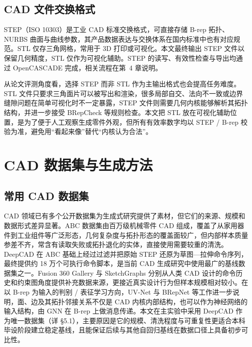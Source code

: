 \subsection{CAD 文件交换格式}

STEP（ISO 10303）是工业 CAD 标准交换格式，可直接存储 B-rep 拓扑、NURBS 曲面与曲线参数，其产品数据表达与交换体系在国内标准中也有对应规范\cite{gbt16656_1_2008,gbt16656_11_2010,gbt16656_21_2008}。STL 仅存三角网格，常用于 3D 打印或可视化。本文最终输出 STEP 文件以保留几何精度，STL 仅作为可视化辅助。STEP 的读写、有效性检查与导出均通过 OpenCASCADE 完成，相关流程在第~4 章说明。

从论文评测角度看，选择 STEP 而非 STL 作为主输出格式也会提高任务难度。STL 文件只要求三角面片可以被写出和渲染，很多局部自交、法向不一致或边界缝隙问题在简单可视化时不一定暴露，STEP 文件则需要几何内核能够解析其拓扑结构，并进一步接受 BRepCheck 等规则检查。本文把 STL 放在可视化辅助位置，是为了便于人工观察生成零件外观，但所有有效率数字均以 STEP / B-rep 校验为准，避免用“看起来像”替代“内核认为合法”。

\section{CAD 数据集与生成方法}

\subsection{常用 CAD 数据集}

CAD 领域已有多个公开数据集为生成式研究提供了素材，但它们的来源、规模和数据形式差异显著。ABC 数据集由百万级机械零件 CAD 组成，覆盖了从家用器件到工业组件等广泛形态，几何复杂度与拓扑形态的覆盖面较广\cite{koch_2019_abc}，但内部样本质量参差不齐，常含有读取失败或拓扑退化的实体，直接使用需要较重的清洗。DeepCAD\cite{wu_2021_deepcad} 在 ABC 基础上经过过滤并把原始 STEP 还原为草图—拉伸命令序列，最终提供约 18 万个可执行命令脚本，是当前 CAD 生成研究中使用最广的基线数据集之一。Fusion 360 Gallery 与 SketchGraphs 分别从人类 CAD 设计的命令历史和约束图角度提供补充数据来源\cite{willis_2021_fusion360,seff_2020_sketchgraphs}，更接近真实设计行为但样本规模相对较小。在以 B-rep 为输入的判别 / 表征学习方向，UV-Net\cite{Jayaraman_2021_CVPR} 与 BRepNet\cite{lambourne_2021_brepnet} 等工作进一步说明，面、边及其拓扑邻接关系不仅是 CAD 内核内部结构，也可以作为神经网络的输入结构，由 GNN 在 B-rep 上做消息传递。本文在主实验中采用 DeepCAD 作为唯一数据集（详 §5.1），主要原因是它的规模、清洗程度与可重复性更适合本科毕设阶段建立稳定基线，且能保证后续与其他自回归基线在数据口径上具备初步可比性。


